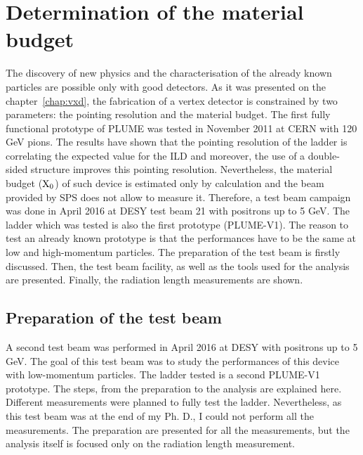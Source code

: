 \chapter{Determination of the material budget}

  The discovery of new physics and the characterisation of the already known particles are possible only with good detectors.
  As it was presented on the chapter~\ref{chap:vxd}, the fabrication of a vertex detector is constrained by two parameters: the pointing resolution and the material budget.
  The first fully functional prototype of \gls{PLUME} was tested in November 2011 at CERN with 120 GeV pions.
  The results have shown that the pointing resolution of the ladder is correlating the expected value for the \gls{ILD} and moreover, the use of a double-sided structure improves this pointing resolution. 
  Nevertheless, the material budget ($\rm{X}_0$) of such device is estimated only by calculation and the beam provided by SPS does not allow to measure it.
  Therefore, a test beam campaign was done in April 2016 at DESY test beam 21 with positrons up to 5 GeV.
  The ladder which was tested is also the first prototype (PLUME-V1). 
  The reason to test an already known prototype is that the performances have to be the same at low and high-momentum particles.
  The preparation of the test beam is firstly discussed.
  Then, the test beam facility, as well as the tools used for the analysis are presented.
  Finally, the radiation length measurements are shown.


\minitoc

  \section{Preparation of the test beam}

   A second test beam was performed in April 2016 at DESY with positrons up to 5 GeV. 
   The goal of this test beam was to study the performances of this device with low-momentum particles.
   The ladder tested is a second PLUME-V1 prototype.
   The steps, from the preparation to the analysis are explained here.
   Different measurements were planned to fully test the ladder.
   Nevertheless, as this test beam was at the end of my Ph. D., I could not perform all the measurements.
   The preparation are presented for all the measurements, but the analysis itself is focused only on the radiation length measurement.

